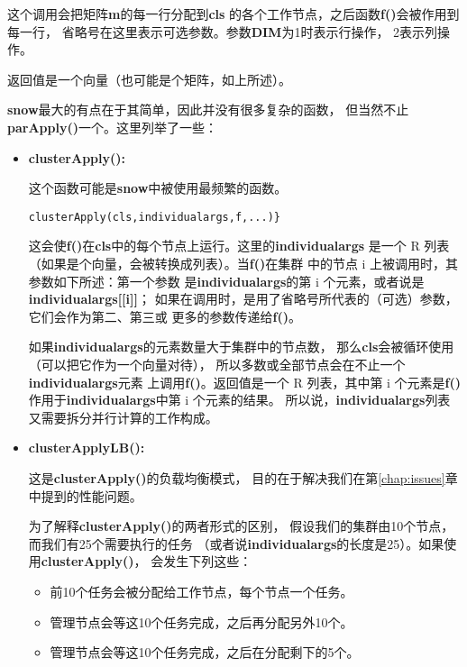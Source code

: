 这个调用会把矩阵{\bf m}的每一行分配到{\bf cls}
的各个工作节点，之后函数{\bf f()}会被作用到每一行，
省略号在这里表示可选参数。参数{\bf DIM}为1时表示行操作，
2表示列操作。

返回值是一个向量（也可能是个矩阵，如上所述）。

{\bf snow}最大的有点在于其简单，因此并没有很多复杂的函数，
但当然不止{\bf parApply()}一个。这里列举了一些：

\begin{itemize}

\item {\bf clusterApply():}

这个函数可能是{\bf snow}中被使用最频繁的函数。

\begin{lstlisting}
clusterApply(cls,individualargs,f,...)}
\end{lstlisting}

这会使{\bf f()}在{\bf cls}中的每个节点上运行。这里的{\bf individualargs}
是一个 R 列表（如果是个向量，会被转换成列表）。当{\bf f()}在集群
中的节点 i 上被调用时，其参数如下所述：第一个参数
是{\bf individualargs}的第 i 个元素，或者说是{\bf individualargs[[i]]}；
如果在调用时，是用了省略号所代表的（可选）参数，它们会作为第二、第三或
更多的参数传递给{\bf f()}。

如果{\bf individualargs}的元素数量大于集群中的节点数，
那么{\bf cls}会被循环使用（可以把它作为一个向量对待），
所以多数或全部节点会在不止一个{\bf individualargs}元素
上调用{\bf f()}。返回值是一个 R 列表，其中第 i 个元素是{\bf f()}
作用于{\bf individualargs}中第 i 个元素的结果。
所以说，{\bf individualargs}列表又需要拆分并行计算的工作构成。

\item {\bf clusterApplyLB():}

这是{\bf clusterApply()}的负载均衡模式，
目的在于解决我们在第\ref{chap:issues}章中提到的性能问题。

为了解释{\bf clusterApply()}的两者形式的区别，
假设我们的集群由10个节点，而我们有25个需要执行的任务
（或者说{\bf individualargs}的长度是25）。如果使用{\bf clusterApply()}，
会发生下列这些：

\begin{itemize}

\item 前10个任务会被分配给工作节点，每个节点一个任务。

\item 管理节点会等这10个任务完成，之后再分配另外10个。

\item 管理节点会等这10个任务完成，之后在分配剩下的5个。


\end{itemize}
\end{itemize}
